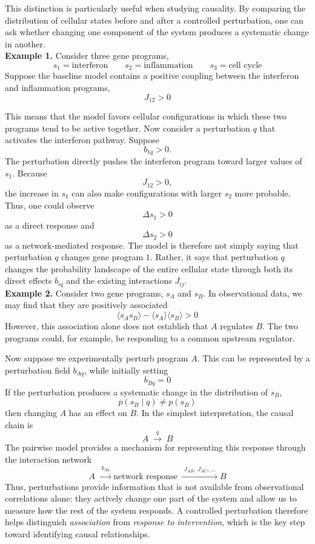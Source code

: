 \documentclass[11pt,a4paper]{article}
\begin{document}
This distinction is particularly useful when studying causality. By comparing the distribution of cellular states before and after a controlled perturbation, one can ask whether changing one component of the system produces a systematic change in another. \\

\textbf{Example 1.} Consider three gene programs,
\[
s_1=\text{interferon}
\qquad
s_2=\text{inflammation}
\qquad
s_3=\text{cell cycle}
\]
Suppose the baseline model contains a positive coupling between the interferon and inflammation programs,
\[
J_{12}>0
\]

This means that the model favors cellular configurations in which these two programs tend to be active together. Now consider a perturbation $q$ that activates the interferon pathway. Suppose
\[
b_{1q}>0.
\]
The perturbation directly pushes the interferon program toward larger values of $s_1$. Because
\[
J_{12}>0,
\]
the increase in $s_1$ can also make configurations with larger $s_2$ more probable. Thus, one could observe
\[
\Delta s_1>0
\]
as a direct response and
\[
\Delta s_2>0
\]
as a network-mediated response. The model is therefore not simply saying that perturbation $q$ changes gene program $1$. Rather, it says that perturbation $q$ changes the probability landscape of the entire cellular state through both its direct effects $b_{iq}$ and the existing interactions $J_{ij}$. \\


\textbf{Example 2.} Consider two gene programs, $s_A$ and $s_B$. In observational data, we may find that they are positively associated
\[
\langle s_A s_B\rangle
-
\langle s_A\rangle\langle s_B\rangle
>0
\]
However, this association alone does not establish that $A$ regulates $B$. The two programs could, for example, be responding to a common upstream regulator.

Now suppose we experimentally perturb program $A$. This can be represented by a perturbation field $b_{Aq}$, while initially setting
\[
b_{Bq}=0
\]
If the perturbation produces a systematic change in the distribution of $s_B$,
\[
p(s_B\mid q)\neq p(s_B)
\]
then changing $A$ has an effect on $B$. In the simplest interpretation, the causal chain is
\[
A
\;\xrightarrow{\;q\;}\;
B
\]
The pairwise model provides a mechanism for representing this response through the interaction network
\[
A
\;\xrightarrow{\;b_{Aq}\;}
\text{network response}
\;\xrightarrow{\;J_{AB},\,J_{AC},\,\ldots\;}
B
\]
Thus, perturbations provide information that is not available from observational correlations alone: they actively change one part of the system and allow us to measure how the rest of the system responds. A controlled perturbation therefore helps distinguish \textit{association} from \textit{response to intervention}, which is the key step toward identifying causal relationships. 
\end{document}
